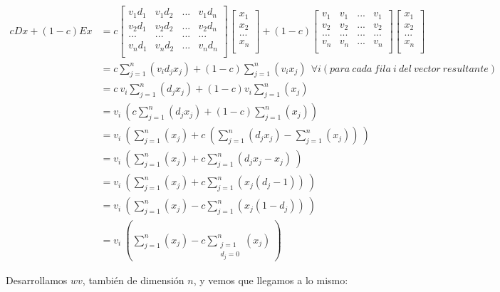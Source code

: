 \begin{align*}
cDx + (1-c)Ex & = c 
\begin{bmatrix}
v_1d_1 & v_1d_2 & ... & v_1d_n \\
v_2d_1 & v_2d_2 & ... & v_2d_n \\
... & ... & ... & ... \\
v_nd_1 & v_nd_2 & ... & v_nd_n \\
\end{bmatrix}
\begin{bmatrix}
x_1 \\
x_2 \\
... \\
x_n \\
\end{bmatrix}
+
(1-c)
\begin{bmatrix}
v_1 & v_1 & ... & v_1 \\
v_2 & v_2 & ... & v_2 \\
... & ... & ... & ... \\
v_n & v_n & ... & v_n \\
\end{bmatrix}
\begin{bmatrix}
x_1 \\
x_2 \\
... \\
x_n \\
\end{bmatrix} 
\\ 
& = c \sum_{j = 1}^n (v_i d_j x_j) + (1-c) \sum_{j=1}^n (v_i x_j) \ \ \forall{i} (para\  cada\ fila\ i\ del\ vector\ resultante) \\
& = c \ v_i \sum_{j = 1}^n (d_j x_j) + (1-c) v_i \sum_{j=1}^n (x_j) \\
& = v_i \ ( c \sum_{j = 1}^n (d_j x_j) + (1-c) \sum_{j=1}^n (x_j) ) \\
& = v_i \ ( \sum_{j=1}^n (x_j) + c\ (\sum_{j = 1}^n (d_j x_j) - \sum_{j=1}^n (x_j))\ ) \\
& = v_i \ ( \sum_{j=1}^n (x_j) + c \sum_{j = 1}^n (d_j x_j - x_j)\ )\\
& = v_i \ ( \sum_{j=1}^n (x_j) + c \sum_{j = 1}^n (x_j (d_j - 1))\ ) \\
& = v_i \ ( \sum_{j=1}^n (x_j) - c \sum_{j = 1}^n (x_j (1 - d_j))\ ) \\
& = v_i \ ( \sum_{j=1}^n (x_j) - c \sum_{\substack{j = 1 \\ d_j = 0}}^n (x_j)\ )
\end{align*}

\par Desarrollamos $wv$, también de dimensión $n$, y vemos que llegamos a lo mismo: 

